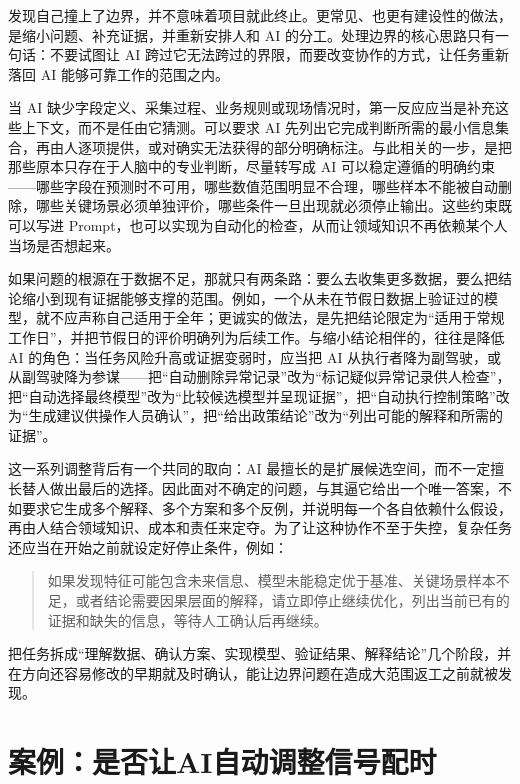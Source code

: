 发现自己撞上了边界，并不意味着项目就此终止。更常见、也更有建设性的做法，是缩小问题、补充证据，并重新安排人和 AI 的分工。处理边界的核心思路只有一句话：不要试图让 AI 跨过它无法跨过的界限，而要改变协作的方式，让任务重新落回 AI 能够可靠工作的范围之内。

当 AI 缺少字段定义、采集过程、业务规则或现场情况时，第一反应应当是补充这些上下文，而不是任由它猜测。可以要求 AI 先列出它完成判断所需的最小信息集合，再由人逐项提供，或对确实无法获得的部分明确标注。与此相关的一步，是把那些原本只存在于人脑中的专业判断，尽量转写成 AI 可以稳定遵循的明确约束——哪些字段在预测时不可用，哪些数值范围明显不合理，哪些样本不能被自动删除，哪些关键场景必须单独评价，哪些条件一旦出现就必须停止输出。这些约束既可以写进 Prompt，也可以实现为自动化的检查，从而让领域知识不再依赖某个人当场是否想起来。

如果问题的根源在于数据不足，那就只有两条路：要么去收集更多数据，要么把结论缩小到现有证据能够支撑的范围。例如，一个从未在节假日数据上验证过的模型，就不应声称自己适用于全年；更诚实的做法，是先把结论限定为“适用于常规工作日”，并把节假日的评价明确列为后续工作。与缩小结论相伴的，往往是降低 AI 的角色：当任务风险升高或证据变弱时，应当把 AI 从执行者降为副驾驶，或从副驾驶降为参谋——把“自动删除异常记录”改为“标记疑似异常记录供人检查”，把“自动选择最终模型”改为“比较候选模型并呈现证据”，把“自动执行控制策略”改为“生成建议供操作人员确认”，把“给出政策结论”改为“列出可能的解释和所需的证据”。

这一系列调整背后有一个共同的取向：AI 最擅长的是扩展候选空间，而不一定擅长替人做出最后的选择。因此面对不确定的问题，与其逼它给出一个唯一答案，不如要求它生成多个解释、多个方案和多个反例，并说明每一个各自依赖什么假设，再由人结合领域知识、成本和责任来定夺。为了让这种协作不至于失控，复杂任务还应当在开始之前就设定好停止条件，例如：

\begin{quote}
如果发现特征可能包含未来信息、模型未能稳定优于基准、关键场景样本不足，或者结论需要因果层面的解释，请立即停止继续优化，列出当前已有的证据和缺失的信息，等待人工确认后再继续。
\end{quote}

把任务拆成“理解数据、确认方案、实现模型、验证结果、解释结论”几个阶段，并在方向还容易修改的早期就及时确认，能让边界问题在造成大范围返工之前就被发现。

\section{案例：是否让AI自动调整信号配时}


